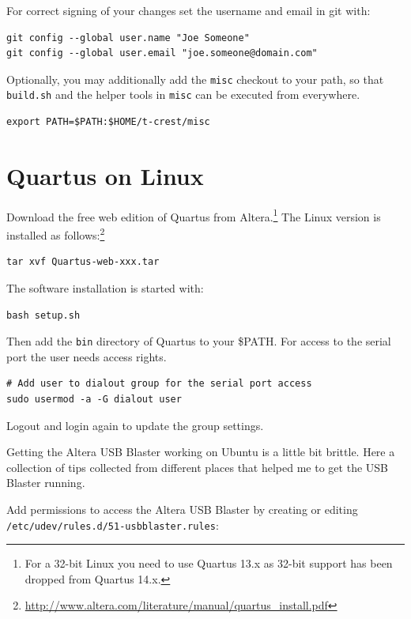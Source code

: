 \documentclass[a4paper,fontsize=10pt,twoside,DIV15,BCOR12mm,headinclude=true,footinclude=false,pagesize,bibtotoc]{scrbook}
\newcommand{\code}[1]{{\texttt{#1}}}
\begin{document}
For correct signing of your changes set the username and email in git with:

\begin{verbatim}
git config --global user.name "Joe Someone"
git config --global user.email "joe.someone@domain.com"
\end{verbatim}

Optionally, you may additionally add the \code{misc} checkout to your path, so that \code{build.sh} and the helper tools in 
\code{misc} can be executed from everywhere.

\begin{verbatim}
export PATH=$PATH:$HOME/t-crest/misc
\end{verbatim}


\section{Quartus on Linux}

Download the free web edition of Quartus from Altera.\footnote{For a 32-bit Linux you need to
use Quartus 13.x as 32-bit support has been dropped from Quartus 14.x.}
The Linux version is
installed as follows:\footnote{\url{http://www.altera.com/literature/manual/quartus_install.pdf}}

\begin{verbatim}
tar xvf Quartus-web-xxx.tar
\end{verbatim}

The software installation is started with:

\begin{verbatim}
bash setup.sh
\end{verbatim}

Then add the \code{bin} directory of Quartus to your \$PATH.
%
For access to the serial port the user needs access rights.

\begin{verbatim}
# Add user to dialout group for the serial port access
sudo usermod -a -G dialout user
\end{verbatim}

Logout and login again to update the group settings.

Getting the Altera USB Blaster working on Ubuntu is a little bit brittle.
Here a collection of tips collected from different places that helped me to
get the USB Blaster running.

Add permissions to access the Altera USB Blaster by creating or editing \code{/etc/udev/rules.d/51-usbblaster.rules}:
\end{document}
